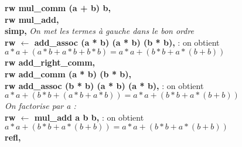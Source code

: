 \documentclass{article}
\begin{document}
 \textbf{ rw mul\_comm (a + b) b,} \\
  \textbf{rw mul\_add,} \\
 \textbf{simp,}  \textit{On met les termes à gauche dans le bon ordre } \\
  \textbf{rw $\leftarrow$ add\_assoc (a * b) (a * b) (b * b),} : on obtient $a * a + (a * b + a * b + b * b) = a * a + (b * b + a * (b + b))$\\
  \textbf{rw add\_right\_comm,} \\
  \textbf{rw add\_comm (a * b) (b * b),} \\
  \textbf{rw add\_assoc (b * b) (a * b) (a * b),} : on obtient $a * a + (b * b + (a * b + a * b)) = a * a + (b * b + a * (b + b))$\\
  \textit{On factorise par a :}\\
  \textbf{rw $\leftarrow$ mul\_add a b b,} : on obtient $a * a + (b * b + a * (b + b)) = a * a + (b * b + a * (b + b))
$\\
  \textbf{refl,}\\
\end{document}
